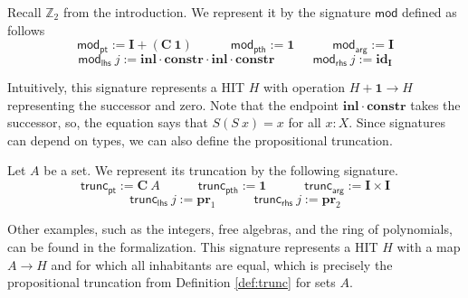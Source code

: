 \documentclass[9pt]{entcs}
\newcommand{\constructor}[1]{\mathbf{#1}}
\newcommand{\function}[1]{\mathsf{#1}}
\newcommand{\0}{\textbf{0}} %
\newcommand{\unitt}{\textbf{1}} %
\newcommand{\Def}{:=} %
\newcommand{\C}{\constructor{C}} %
\newcommand{\I}{\constructor{I}} %
\newcommand{\sumP}[2]{#1 + #2} %
\newcommand{\prodP}[2]{#1 \times #2} %
\newcommand{\id}[1]{\constructor{id}_{#1}} %
\newcommand{\comp}[2]{#1 \cdot #2} %
\newcommand{\inle}{\constructor{inl}} %
\newcommand{\prle}{\constructor{pr}_1} %
\newcommand{\prre}{\constructor{pr}_2} %
\newcommand{\constr}{\constructor{constr}} %
\newcommand{\pt}[0]{\textsf{pt}}
\newcommand{\pthI}[0]{\textsf{pth}}
\newcommand{\pthA}[0]{\textsf{arg}}
\newcommand{\pthlh}[0]{\textsf{lhs}}
\newcommand{\pthrh}[0]{\textsf{rhs}}
\newcommand{\pointc}[1]{#1_{\pt}} %
\newcommand{\pathI}[1]{#1_{\pthI}} %
\newcommand{\pathA}[1]{#1_{\pthA}} %
\newcommand{\pathlh}[1]{#1_{\pthlh}} %
\newcommand{\pathrh}[1]{#1_{\pthrh}} %
\newcommand{\modsig}{\function{mod}} %
\newcommand{\trunc}{\function{trunc}} %
\newcommand{\modZ}{\mathbb{Z}_2} %
\newcommand{\remove}[1]{} %
\begin{document}
\begin{example}
\label{ex:modsig}
Recall $\modZ$ from the introduction.
We represent it by the signature $\modsig$ defined as follows
\[
\pointc{\modsig} \Def \sumP{\I}{(\C \> \unitt)}
\quad \quad \quad
\pathI{\modsig} \Def \unitt
\quad \quad \quad
\pathA{\modsig} \Def \I\]
\[
\pathlh{\modsig} \> j \Def \comp{\comp{\comp{\inle}{\constr}}{\inle}}{\constr}
\quad \quad \quad
\pathrh{\modsig} \> j \Def \id{\I}
\]
\remove{
\begin{itemize}
	\item $\pointc{\modsig} \Def \sumP{\I}{(\C \> \unitt)}$;
	\item $\pathI{\modsig} \Def \unitt$;
	\item $\pathA{\modsig} \Def \I$;
	\item $\pathlh{\modsig} \> j \Def \comp{\comp{\comp{\inle}{\constr}}{\inle}}{\constr}$;
	\item $\pathrh{\modsig} \> j \Def \id{\I}$;
\end{itemize}
}
\end{example}

Intuitively, this signature represents a HIT $H$ with operation $H + \unitt \rightarrow H$ representing the successor and zero.
Note that the endpoint $\comp{\inle}{\constr}$ takes the successor, so, the equation says that $S(S \> x) = x$ for all $x : X$.
Since signatures can depend on types, we can also define the propositional truncation.

\begin{example}
\label{ex:truncsig}
Let $A$ be a set.
We represent its truncation by the following signature.
\[
\pointc{\trunc} \Def \C \> A
\quad \quad \quad
\pathI{\trunc} \Def \unitt
\quad \quad \quad
\pathA{\trunc} \Def \prodP{\I}{\I}
\]
\[
\pathlh{\trunc} \> j \Def \prle
\quad \quad \quad
\pathrh{\trunc} \> j \Def \prre
\]
\remove{
\begin{itemize}
	\item $\pointc{\trunc} \Def \C \> A$;
	\item $\pathI{\trunc} \Def \unitt$;
	\item $\pathA{\trunc} \Def \prodP{\I}{\I}$;
	\item $\pathlh{\trunc} \> j \Def \prle$;
	\item $\pathrh{\trunc} \> j \Def \prre$;
\end{itemize}
}
\end{example}

Other examples, such as the integers, free algebras, and the ring of polynomials, can be found in the formalization.
This signature represents a HIT $H$ with a map $A \rightarrow H$ and for which all inhabitants are equal, which is precisely the propositional truncation from Definition \ref{def:trunc} for sets $A$.
\end{document}
